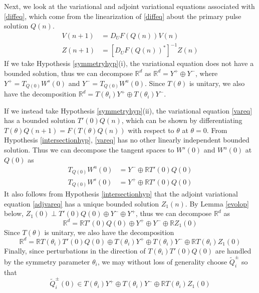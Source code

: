 \documentclass[12pt]{article}
\def\R{{\mathbb R}}
\begin{document}
Next, we look at the variational and adjoint variational equations associated with \eqref{diffeq}, which come from the linearization of \eqref{diffeq} about the primary pulse solution $Q(n)$.
\begin{align}
V(n+1) &= D_U F(Q(n)) V(n) \label{vareq} \\
Z(n+1) &= [D_U F(Q(n))^*]^{-1} Z(n) \label{adjvareq} 
\end{align}
If we take Hypothesis \ref{symmetryhyp}(i), the variational equation does not have a bounded solution, thus we can decompose $\R^d$ as $\R^d = Y^+ \oplus Y^-$, where $Y^+ = T_{Q(0)} W^s(0)$ and $Y^- = T_{Q(0)} W^u(0)$. Since $T(\theta)$ is unitary, we also have the decomposition $\R^d = T(\theta_i) Y^+ \oplus T(\theta_i) Y^-$.

If we instead take Hypothesis \ref{symmetryhyp}(ii), the variational equation \eqref{vareq} has a bounded solution $T'(0) Q(n)$, which can be shown by differentiating $T(\theta) Q(n+1) = F(T(\theta)Q(n))$ with respect to $\theta$ at $\theta = 0$. From Hypothesis \ref{intersectionhyp}, \eqref{vareq} has no other linearly independent bounded solution. Thus we can decompose the tangent spaces to $W^s(0)$ and $W^u(0)$ at $Q(0)$ as
\begin{align*}
T_{Q(0)} W^u(0) &= Y^- \oplus \R T'(0) Q(0) \\
T_{Q(0)} W^s(0) &= Y^+ \oplus \R T'(0) Q(0)
\end{align*}
It also follows from Hypothesis \ref{intersectionhyp} that the adjoint variational equation \eqref{adjvareq} has a unique bounded solution $Z_1(n)$. By Lemma \ref{evolop} below, $Z_1(0) \perp T'(0) Q(0) \oplus Y^- \oplus Y^+$, thus we can decompose $\R^d$ as
\begin{equation}\label{nontdecomp}
\R^d = \R T'(0) Q(0) \oplus Y^+ \oplus Y^- \oplus \R Z_1(0)
\end{equation}
Since $T(\theta)$ is unitary, we also have the decomposition
\begin{equation}\label{nontdecompT}
\R^d = \R T(\theta_i) T'(0) Q(0) \oplus T(\theta_i) Y^+ \oplus T(\theta_i) Y^- \oplus \R T(\theta_i) Z_1(0)
\end{equation}
Finally, since perturbations in the direction of $T(\theta_i) T'(0) Q(0)$ are handled by the symmetry parameter $\theta_i$, we may without loss of generality choose $\tilde{Q}_i^\pm$ so that 
\begin{equation}\label{W0loc}
\tilde{Q}_i^\pm(0) \in T(\theta_i) Y^+ \oplus T(\theta_i) Y^- \oplus \R T(\theta_i) Z_1(0)
\end{equation}
\end{document}
